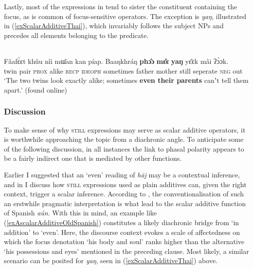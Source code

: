 {Lastly, most of the expressions in  tend to sister the constituent containing the focus, as is common of focus-sensitive operators. The exception is  \textit{yaŋ}, illustrated in (\ref{exScalarAdditiveThai}), which invariably follows the subject NPs and precedes all elements belonging to the predicate.

\begin{exe}
	\ex {}\label{exScalarAdditiveThai}\\
	\gll Fǎafɛ̀ɛt	khûu	nîi	mɯ̌an	kan		píap. Baaŋkhráŋ	\textbf{phɔ̂ɔ}		\textbf{mɛ̂ɛ}		\textbf{yaŋ}		yɛ̂ɛk		mâi		ʔɔ̀ɔk.\\
twin		pair	\textsc{prox}	alike	\textsc{recp} \textsc{ideoph}	sometimes father mother still seperate \textsc{neg} out\\
	\glt \lq The two twins look exactly alike; sometimes \textbf{even their parents} canʼt tell them apart.' (found online)%
\end{exe}

\subsubsection{Discussion} To make sense of why \textsc{still} expressions may serve as scalar additive operators, it is worthwhile approaching the topic from a diachronic angle. To anticipate some of the following discussion, in all instances the link to phasal polarity appears to be a fairly indirect one that is mediated by other functions.

Earlier I suggested that an \lq even\rq{ }reading of  \textit{hāj} may be a contextual inference,  and in  I discuss how \textsc{still} expressions used as plain additives can, given the right context, trigger a scalar inference. According to \textcite{Trujillo1990}, the conventionalisation of such an erstwhile pragmatic interpretation is what lead to the scalar additive function of Spanish \textit{aún}. With this in mind, an example like (\ref{exAscalarAdditiveOldSpanish}) constitutes a likely diachronic bridge from \lq in addition\rq{ }to \lq even\rq{}. Here, the discourse context evokes a scale of affectedness on which the focus denotation \lq his body and soul\rq{ }ranks higher than the alternative \lq his possessions and eyes\rq{ }mentioned in the preceding clause. Most likely, a similar scenario can be posited for  \textit{yaŋ}, seen in (\ref{exScalarAdditiveThai}) above. 

}
